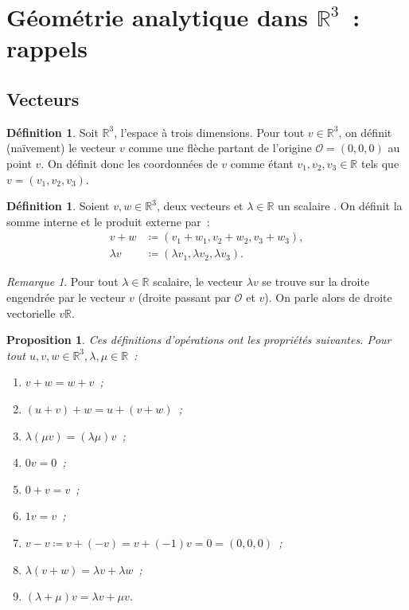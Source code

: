 \documentclass{article}
\newcommand{\R}{\mathbb R}
\newtheorem{prp}[thm]{Proposition}
\theoremstyle{definition}
\newtheorem{déf}[thm]{Définition}
\theoremstyle{remark}
\newtheorem*{rmq}{Remarque}
\begin{document}
\newpage
\section{Géométrie analytique dans $\R^3$~: rappels}
	\subsection{Vecteurs}
		\begin{déf} Soit $\R^3$, l'espace à trois dimensions. Pour tout $v \in \R^3$, on définit (naïvement) le vecteur $v$ comme une flèche partant de l'origine
		$\mathcal O = (0, 0, 0)$ au point $v$. On définit donc les coordonnées de $v$ comme étant $v_1, v_2, v_3 \in \R$ tels que $v = (v_1, v_2, v_3)$. \end{déf}

		\begin{déf} Soient $v, w \in \R^3$, deux vecteurs et $\lambda \in \R$ un scalaire . On définit la somme interne et le produit externe par~:
		\begin{align*}
			v+w &\coloneqq (v_1+w_1, v_2+w_2, v_3+w_3), \\
			\lambda v &\coloneqq (\lambda v_1, \lambda v_2, \lambda v_3).
		\end{align*}
		\end{déf}

		\begin{rmq} Pour tout $\lambda \in \R$ scalaire, le vecteur $\lambda v$ se trouve sur la droite engendrée par le vecteur $v$ (droite passant par $\mathcal O$
		et $v$). On parle alors de droite vectorielle $v\R$. \end{rmq}

		\begin{prp} Ces définitions d'opérations ont les propriétés suivantes. Pour tout $u, v, w \in \R^3, \lambda, \mu \in \R$~:
		\begin{enumerate}
			\item $v+w = w+v$~;
			\item $(u+v)+w = u+(v+w)$~;
			\item $\lambda(\mu v) = (\lambda\mu)v$~;
			\item $0v = 0$~;
			\item $0 + v = v$~;
			\item $1v = v$~;
			\item $v - v \coloneqq v + (-v) = v + (-1)v = 0 = (0, 0, 0)$~;
			\item $\lambda (v+w) = \lambda v + \lambda w$~;
			\item $(\lambda + \mu) v = \lambda v + \mu v$.
		\end{enumerate}
		\end{prp}
\end{document}
